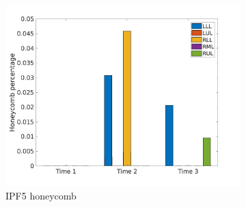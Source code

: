 \begin{figure}[H]
\begin{subfigure}{.46\linewidth}
  \includegraphics[width=\linewidth,trim={{.0\wd0} {.0\wd0} {.0\wd0} {.0\wd0}},clip]{Appendix/Image_AppexA/LobarDistribution/IPF5HoneycombLobarRegionDiseaseDistributionOverTime.jpg} %
  \caption{IPF5 honeycomb}
  \label{fig:IPF5LobarRegionDiseaseDistributionOverTime-c} 
\end{subfigure} 
\hspace{.3in}
\begin{subfigure}{.46\linewidth}%

\end{subfigure}
\end{figure}
